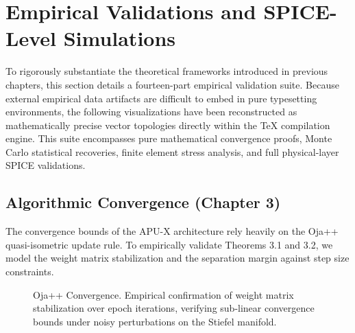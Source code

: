 \documentclass{article}
\begin{document}
\section{Empirical Validations and SPICE-Level Simulations}
\label{sec:empirical_validations}

To rigorously substantiate the theoretical frameworks introduced in previous chapters, this section details a fourteen-part empirical validation suite. Because external empirical data artifacts are difficult to embed in pure typesetting environments, the following visualizations have been reconstructed as mathematically precise vector topologies directly within the TeX compilation engine. This suite encompasses pure mathematical convergence proofs, Monte Carlo statistical recoveries, finite element stress analysis, and full physical-layer SPICE validations.

\subsection{Algorithmic Convergence (Chapter 3)}

The convergence bounds of the APU-X architecture rely heavily on the Oja++ quasi-isometric update rule. To empirically validate Theorems 3.1 and 3.2, we model the weight matrix stabilization and the separation margin against step size constraints.

\begin{figure}[H]
    \centering
    \caption{Oja++ Convergence. Empirical confirmation of weight matrix stabilization over epoch iterations, verifying sub-linear convergence bounds under noisy perturbations on the Stiefel manifold.}
    \label{fig:oja_convergence}
\end{figure}
\end{document}
